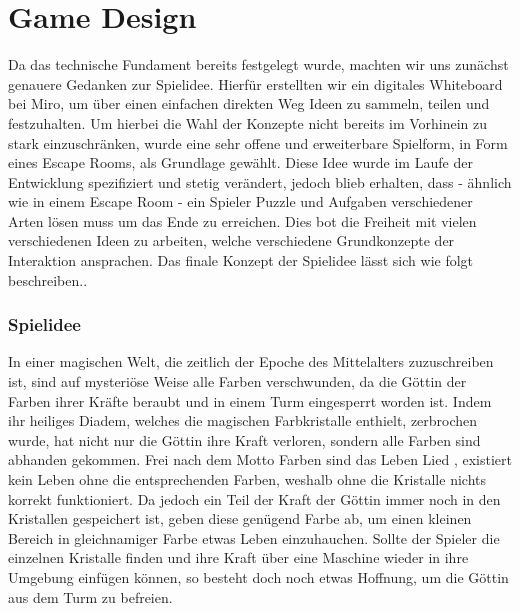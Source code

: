 \chapter{Game Design}
Da das technische Fundament bereits festgelegt wurde, machten wir uns zunächst genauere Gedanken zur Spielidee. Hierfür erstellten wir ein digitales Whiteboard bei Miro, um über einen einfachen direkten Weg Ideen zu sammeln, teilen und festzuhalten. Um hierbei die Wahl der Konzepte nicht bereits im Vorhinein zu stark einzuschränken, wurde eine sehr offene und erweiterbare Spielform, in Form eines \dq Escape Rooms\dq, als Grundlage gewählt. Diese Idee wurde im Laufe der Entwicklung spezifiziert und stetig verändert, jedoch blieb erhalten, dass - ähnlich wie in einem Escape Room - ein Spieler Puzzle und Aufgaben verschiedener Arten lösen muss um das Ende zu erreichen. Dies bot die Freiheit mit vielen verschiedenen Ideen zu arbeiten, welche verschiedene Grundkonzepte der Interaktion ansprachen. Das finale Konzept der Spielidee lässt sich wie folgt beschreiben..\\
\subsection{Spielidee}
In einer magischen Welt, die zeitlich der Epoche des Mittelalters zuzuschreiben ist, sind auf mysteriöse Weise alle Farben verschwunden, da die Göttin der Farben ihrer Kräfte beraubt und in einem Turm eingesperrt worden ist. Indem ihr heiliges Diadem, welches die magischen Farbkristalle enthielt, zerbrochen wurde, hat nicht nur die Göttin ihre Kraft verloren, sondern alle Farben sind abhanden gekommen. Frei nach dem Motto \dq Farben sind das Leben Lied \dq, existiert kein Leben ohne die entsprechenden Farben, weshalb ohne die Kristalle nichts korrekt funktioniert. Da jedoch ein Teil der Kraft der Göttin immer noch in den Kristallen gespeichert ist, geben diese genügend Farbe ab, um einen kleinen Bereich in gleichnamiger Farbe etwas Leben einzuhauchen. Sollte der Spieler die einzelnen Kristalle finden und ihre Kraft über eine Maschine wieder in ihre Umgebung einfügen können, so besteht doch noch etwas Hoffnung, um die Göttin aus dem Turm zu befreien.\\
